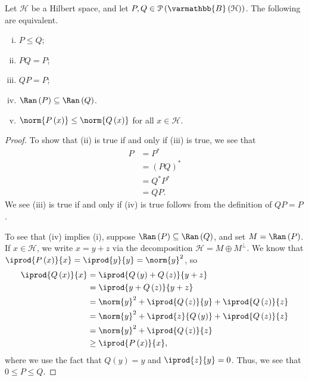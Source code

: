 \documentclass[10pt]{mypackage}
\renewcommand*{\mathbb}[1]{\varmathbb{#1}}
\newcommand{\B}{\mathbb{B}}
\begin{document}
\begin{proposition}
  Let $\mathcal{H}$ be a Hilbert space, and let $P,Q\in \mathcal{P}\left(\B\left(\mathcal{H}\right)\right)$. The following are equivalent.
  \begin{enumerate}[(i)]
    \item $P\leq Q$;
    \item $PQ = P$;
    \item $QP = P$;
    \item $\Ran\left(P\right)\subseteq \Ran\left(Q\right)$.
    \item $\norm{P\left(x\right)}\leq \norm{Q\left(x\right)}$ for all $x\in \mathcal{H}$.
  \end{enumerate}
\end{proposition}
\begin{proof}
  To show that (ii) is true if and only if (iii) is true, we see that
  \begin{align*}
    P &= P^{\ast}\\
      &= \left(PQ\right)^{\ast}\\
      &= Q^{\ast}P^{\ast}\\
      &= QP.
  \end{align*}
  We see (iii) is true if and only if (iv) is true follows from the definition of $QP = P$.\newline

  To see that (iv) implies (i), suppose $\Ran\left(P\right)\subseteq \Ran\left(Q\right)$, and set $M = \Ran\left(P\right)$. If $x\in \mathcal{H}$, we write $x = y + z$ via the decomposition $\mathcal{H} = M \oplus M^{\perp}$. We know that $ \iprod{P\left(x\right)}{x} = \iprod{y}{y} = \norm{y}^2$, so
  \begin{align*}
    \iprod{Q\left(x\right)}{x} &= \iprod{Q\left(y\right) + Q\left(z\right)}{y + z}\\
                               &= \iprod{y + Q\left(z\right)}{y+z}\\
                               &= \norm{y}^2 + \iprod{Q\left(z\right)}{y} + \iprod{Q\left(z\right)}{z}\\
                               &= \norm{y}^2 + \iprod{z}{Q\left(y\right)} + \iprod{Q\left(z\right)}{z}\\
                               &= \norm{y}^2 + \iprod{Q\left(z\right)}{z}\\
                               &\geq \iprod{P\left(x\right)}{x},
  \end{align*}
  where we use the fact that $Q(y) = y$ and $ \iprod{z}{y} = 0 $. Thus, we see that $0 \leq P \leq Q$.\newline


\end{proof}
\end{document}
